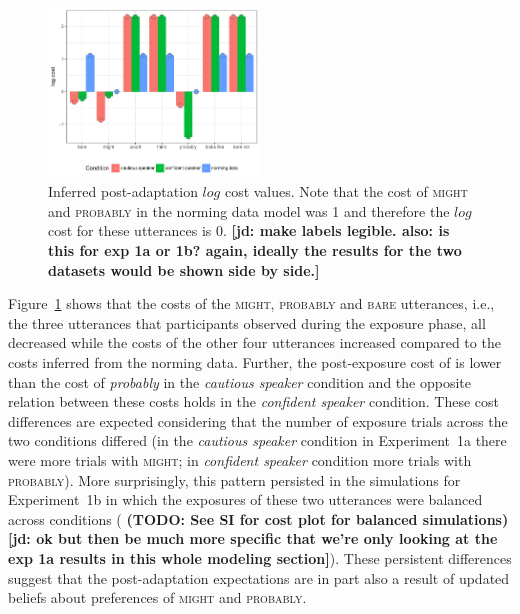 \documentclass[lucida,biblatex]{sp} %
\newcommand{\jd}[1]{\textcolor{PinkyPurple}{\textbf{[jd: #1]}}}
\newcommand{\todo}[1]{}
\renewcommand{\todo}[1]{{\bf \color{red} (TODO: {#1})}}
\begin{document}
\begin{figure}
\center
  \includegraphics[width=0.5\textwidth]{plots/adaptation-posterior-costs.pdf}
  \caption{Inferred post-adaptation $log$ cost values. Note that the cost of \textsc{might} and \textsc{probably} 
  in the norming data model was 1 and therefore the $log$ cost for these utterances is 0. \jd{make labels legible. also: is this for exp 1a or 1b? again, ideally the results for the two datasets would be shown side by side.} \label{fig:post-exposure-costs}}
\end{figure}

Figure~\ref{fig:post-exposure-costs} shows that the costs of the \textsc{might}, \textsc{probably} and
\textsc{bare} utterances, i.e., the three utterances that participants observed during the exposure phase,
all decreased while the costs of the other four utterances increased compared to the costs inferred from the norming
data. Further, the post-exposure cost of  is lower than the cost of \textit{probably} in the \textit{cautious speaker} condition
and the opposite relation between these costs holds in the \textit{confident speaker} condition. These cost differences
are expected considering that the number of exposure trials across the two conditions differed (in the \textit{cautious speaker} condition in Experiment~1a there were more trials
with \textsc{might}; in \textit{confident speaker} condition more trials with \textsc{probably}). More surprisingly, this pattern
persisted in the simulations for Experiment~1b in which the exposures of these two utterances were balanced across conditions 
(\todo{See SI for cost plot for balanced simulations}\jd{ok but then be much more specific that we're only looking at the exp 1a results in this whole modeling section}).
These persistent differences suggest that the post-adaptation expectations 
are in part also a result of updated beliefs about preferences of \textsc{might} and \textsc{probably}. 

%
\end{document}
